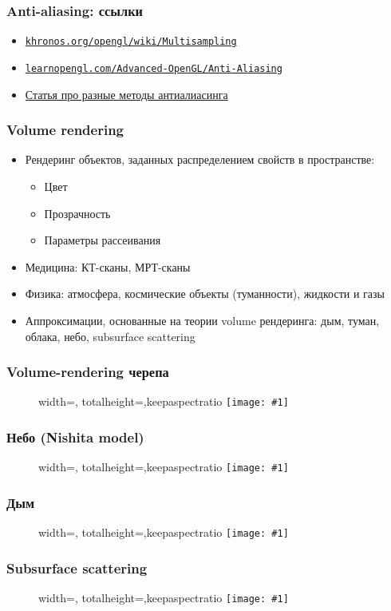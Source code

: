 \documentclass{beamer}
\newcommand{\slideimage}[1]{
  \begin{figure}
    \begin{adjustbox}{width=\textwidth, totalheight=\textheight-2\baselineskip-2\baselineskip,keepaspectratio}
      \texttt{[image: \#1]}
    \end{adjustbox}
  \end{figure}
}
\begin{document}
\begin{frame}[fragile]
\frametitle{Anti-aliasing: ссылки}
\begin{itemize}
\item \href{https://www.khronos.org/opengl/wiki/Multisampling}{\nolinkurl{khronos.org/opengl/wiki/Multisampling}}
\item \href{https://learnopengl.com/Advanced-OpenGL/Anti-Aliasing}{\nolinkurl{learnopengl.com/Advanced-OpenGL/Anti-Aliasing}}
\item \href{https://www.digitaltrends.com/computing/what-is-anti-aliasing}{Статья про разные методы антиалиасинга}
\end{itemize}
\end{frame}

\begin{frame}[fragile]
\frametitle{Volume rendering}
\begin{itemize}
\item Рендеринг объектов, заданных распределением свойств в пространстве:
\pause
\begin{itemize}
\item Цвет
\item Прозрачность
\item Параметры рассеивания
\end{itemize}
\pause
\item Медицина: КТ-сканы, МРТ-сканы
\item Физика: атмосфера, космические объекты (туманности), жидкости и газы
\item Аппроксимации, основанные на теории volume рендеринга: дым, туман, облака, небо, subsurface scattering
\end{itemize}
\end{frame}

\begin{frame}[fragile]
\frametitle{Volume-rendering черепа}
\slideimage{volume-skull.png}
\end{frame}

\begin{frame}[fragile]
\frametitle{Небо (Nishita model)}
\slideimage{sky.jpg}
\end{frame}

\begin{frame}[fragile]
\frametitle{Дым}
\slideimage{smoke.png}
\end{frame}

\begin{frame}[fragile]
\frametitle{Subsurface scattering}
\slideimage{subsurface.jpeg}
\end{frame}
\end{document}
